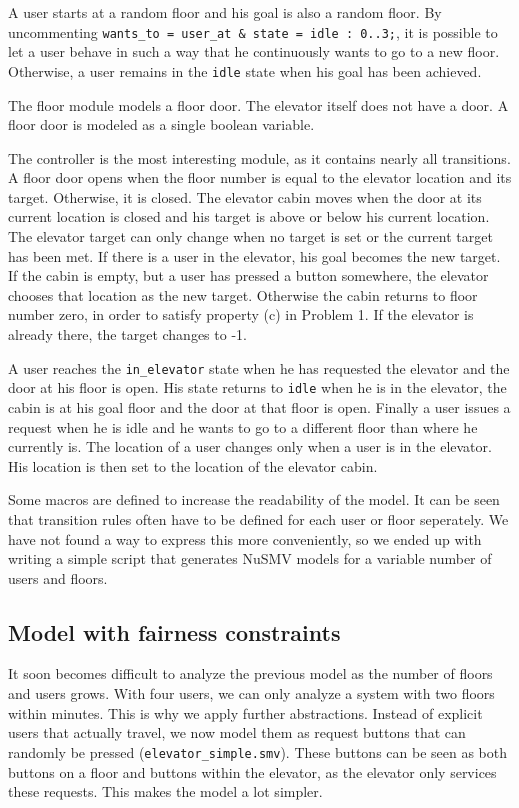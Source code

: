 \documentclass[a4paper,10pt]{article}
\begin{document}
	A user starts at a random floor and his goal is also a random floor. By uncommenting \texttt{wants\_to = user\_at \& state = idle : 0..3;}, it is possible to let a user behave in such a way that he continuously wants to go to a new floor. Otherwise, a user remains in the \texttt{idle} state when his goal has been achieved.
	
	The floor module models a floor door. The elevator itself does not have a door. A floor door is modeled as a single boolean variable.
	
	The controller is the most interesting module, as it contains nearly all transitions. A floor door opens when the floor number is equal to the elevator location and its target. Otherwise, it is closed. The elevator cabin moves when the door at its current location is closed and his target is above or below his current location. The elevator target can only change when no target is set or the current target has been met. If there is a user in the elevator, his goal becomes the new target. If the cabin is empty, but a user has pressed a button somewhere, the elevator chooses that location as the new target. Otherwise the cabin returns to floor number zero, in order to satisfy property (c) in Problem 1. If the elevator is already there, the target changes to -1.
	
	A user reaches the \texttt{in\_elevator} state when he has requested the elevator and the door at his floor is open. His state returns to \texttt{idle} when he is in the elevator, the cabin is at his goal floor and the door at that floor is open. Finally a user issues a request when he is idle and he wants to go to a different floor than where he currently is. The location of a user changes only when a user is in the elevator. His location is then set to the location of the elevator cabin.
	
	Some macros are defined to increase the readability of the model. It can be seen that transition rules often have to be defined for each user or floor seperately. We have not found a way to express this more conveniently, so we ended up with writing a simple script that generates NuSMV models for a variable number of users and floors.
	
	\subsection{Model with fairness constraints}
	It soon becomes difficult to analyze the previous model as the number of floors and users grows. With four users, we can only analyze a system with two floors within minutes. This is why we apply further abstractions. Instead of explicit users that actually travel, we now model them as request buttons that can randomly be pressed (\texttt{elevator\_simple.smv}). These buttons can be seen as both buttons on a floor and buttons within the elevator, as the elevator only services these requests. This makes the model a lot simpler.
	
\end{document}
